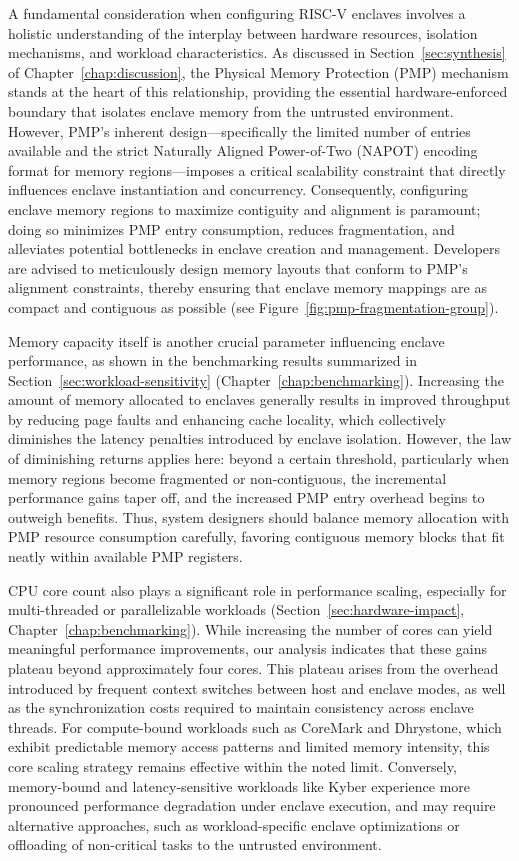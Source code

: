 A fundamental consideration when configuring RISC-V enclaves involves a holistic understanding of the interplay between hardware resources, isolation mechanisms, and workload characteristics. As discussed in Section~\ref{sec:synthesis} of Chapter~\ref{chap:discussion}, the Physical Memory Protection (PMP) mechanism stands at the heart of this relationship, providing the essential hardware-enforced boundary that isolates enclave memory from the untrusted environment. However, PMP’s inherent design—specifically the limited number of entries available and the strict Naturally Aligned Power-of-Two (NAPOT) encoding format for memory regions—imposes a critical scalability constraint that directly influences enclave instantiation and concurrency. Consequently, configuring enclave memory regions to maximize contiguity and alignment is paramount; doing so minimizes PMP entry consumption, reduces fragmentation, and alleviates potential bottlenecks in enclave creation and management. Developers are advised to meticulously design memory layouts that conform to PMP’s alignment constraints, thereby ensuring that enclave memory mappings are as compact and contiguous as possible (see Figure~\ref{fig:pmp-fragmentation-group}).

Memory capacity itself is another crucial parameter influencing enclave performance, as shown in the benchmarking results summarized in Section~\ref{sec:workload-sensitivity} (Chapter~\ref{chap:benchmarking}). Increasing the amount of memory allocated to enclaves generally results in improved throughput by reducing page faults and enhancing cache locality, which collectively diminishes the latency penalties introduced by enclave isolation. However, the law of diminishing returns applies here: beyond a certain threshold, particularly when memory regions become fragmented or non-contiguous, the incremental performance gains taper off, and the increased PMP entry overhead begins to outweigh benefits. Thus, system designers should balance memory allocation with PMP resource consumption carefully, favoring contiguous memory blocks that fit neatly within available PMP registers.

CPU core count also plays a significant role in performance scaling, especially for multi-threaded or parallelizable workloads (Section~\ref{sec:hardware-impact}, Chapter~\ref{chap:benchmarking}). While increasing the number of cores can yield meaningful performance improvements, our analysis indicates that these gains plateau beyond approximately four cores. This plateau arises from the overhead introduced by frequent context switches between host and enclave modes, as well as the synchronization costs required to maintain consistency across enclave threads. For compute-bound workloads such as CoreMark and Dhrystone, which exhibit predictable memory access patterns and limited memory intensity, this core scaling strategy remains effective within the noted limit. Conversely, memory-bound and latency-sensitive workloads like Kyber experience more pronounced performance degradation under enclave execution, and may require alternative approaches, such as workload-specific enclave optimizations or offloading of non-critical tasks to the untrusted environment.

